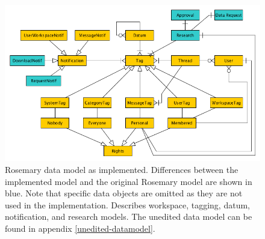 \begin{figure}[h]
	\centering
	\includegraphics[width=0.8\linewidth]{images/datamodel-adapted}
	\caption{
		Rosemary data model as implemented.
		Differences between the implemented \ivfprototype{} model and the original Rosemary model are shown in blue.
		Note that \nsg{} specific data objects are omitted as they are not used in the \ivfprototype{} implementation.
		Describes workspace, tagging, datum, notification, and research models.
		The unedited data model can be found in appendix \ref{unedited-datamodel}.
	}
	\label{fig:implementation-rosemary-dm}
\end{figure}